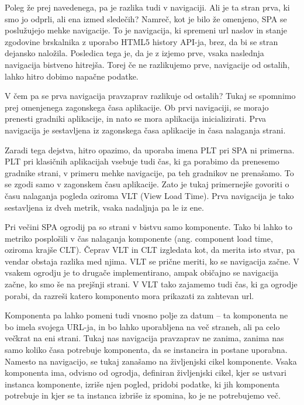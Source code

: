 \documentclass[a4paper, 12pt]{book}
\begin{document}
Poleg že prej navedenega, pa je razlika tudi v navigaciji. Ali je ta stran prva, ki smo jo odprli, ali ena izmed sledečih? Namreč, kot je bilo že omenjeno, SPA se poslužujejo mehke navigacije. To je navigacija, ki spremeni url naslov in stanje zgodovine brskalnika z uporabo HTML5 history API-ja, brez, da bi se stran dejansko naložila. Posledica tega je, da je z izjemo prve, vsaka naslednja navigacija bistveno hitrejša. Torej če ne razlikujemo prve,  navigacije od ostalih, lahko hitro dobimo napačne podatke.

V čem pa se prva navigacija pravzaprav razlikuje od ostalih? Tukaj se spomnimo prej omenjenega zagonskega časa aplikacije. Ob prvi navigaciji, se morajo prenesti gradniki aplikacije, in nato se mora aplikacija inicializirati. Prva navigacija je sestavljena iz zagonskega časa aplikacije in časa nalaganja strani.

Zaradi tega dejstva, hitro opazimo, da uporaba imena PLT pri SPA ni primerna. PLT pri klasičnih aplikacijah vsebuje tudi čas, ki ga porabimo da prenesemo gradnike strani, v primeru mehke navigacije, pa teh gradnikov ne prenašamo. To se zgodi samo v zagonskem času aplikacije. Zato je tukaj primernejše govoriti o času nalaganja pogleda oziroma VLT (View Load Time). Prva navigacija je tako sestavljena iz dveh metrik, vsaka nadaljnja pa le iz ene.

Pri večini SPA ogrodij pa so strani v bistvu samo komponente. Tako bi lahko to metriko posplošili v čas nalaganja komponente (ang. component load time, oziroma krajše CLT). Čeprav VLT in CLT izgledata kot, da merita isto stvar, pa vendar obstaja razlika med njima. VLT se prične meriti, ko se navigacija začne. V vsakem ogrodju je to drugače implementirano, ampak običajno se navigacija začne, ko smo še na prejšnji strani. V VLT tako zajamemo tudi čas, ki ga ogrodje porabi, da razreši katero komponento mora prikazati za zahtevan url.

Komponenta pa lahko pomeni tudi vnosno polje za datum -- ta komponenta ne bo imela svojega URL-ja, in bo lahko uporabljena na več straneh, ali pa celo večkrat na eni strani. Tukaj nas navigacija pravzaprav ne zanima, zanima nas samo koliko časa potrebuje komponenta, da se instancira in postane uporabna. Namesto na navigacijo, se tukaj zanašamo na življenjski cikel komponente. Vsaka komponenta ima, odvisno od ogrodja, definiran življenjski cikel, kjer se ustvari instanca komponente, izriše njen pogled, pridobi podatke, ki jih komponenta potrebuje in kjer se ta instanca izbriše iz spomina, ko je ne potrebujemo več.
\end{document}

